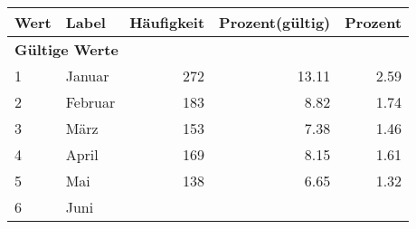      \begin{longtable}{lXrrr}
     \toprule
     \textbf{Wert} & \textbf{Label} & \textbf{Häufigkeit} & \textbf{Prozent(gültig)} & \textbf{Prozent} \\
     \endhead
     \midrule
     \multicolumn{5}{l}{\textbf{Gültige Werte}}\\

     1 &
     \multicolumn{1}{X}{ Januar   } &


       \num{272} &
       \num[round-mode=places,round-precision=2]{13,11} &
         \num[round-mode=places,round-precision=2]{2,59} \\

     2 &
     \multicolumn{1}{X}{ Februar   } &


       \num{183} &
       \num[round-mode=places,round-precision=2]{8,82} &
         \num[round-mode=places,round-precision=2]{1,74} \\

     3 &
     \multicolumn{1}{X}{ März   } &


       \num{153} &
       \num[round-mode=places,round-precision=2]{7,38} &
         \num[round-mode=places,round-precision=2]{1,46} \\

     4 &
     \multicolumn{1}{X}{ April   } &


       \num{169} &
       \num[round-mode=places,round-precision=2]{8,15} &
         \num[round-mode=places,round-precision=2]{1,61} \\

     5 &
     \multicolumn{1}{X}{ Mai   } &


       \num{138} &
       \num[round-mode=places,round-precision=2]{6,65} &
         \num[round-mode=places,round-precision=2]{1,32} \\

     6 &
     \multicolumn{1}{X}{ Juni   } &



\end{longtable}
